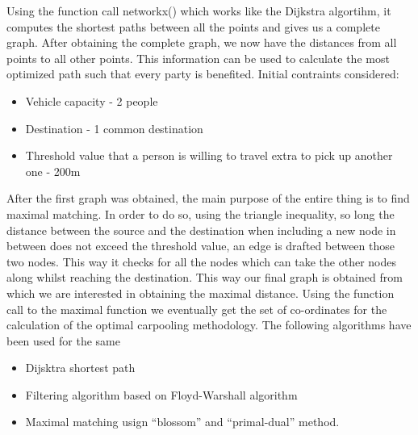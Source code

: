 \documentclass[main.tex]{subfiles}
\begin{document}
Using the function call networkx() which works like the Dijkstra algortihm, it
computes the shortest paths between all the points and gives us a complete
graph.  After obtaining the complete graph, we now have the distances from all
points to all other points. This information can be used to calculate the most
optimized path such that every party is benefited.
Initial contraints considered:
\begin{itemize}
  \item Vehicle capacity - 2 people
  \item Destination      - 1 common destination
  \item Threshold value that a person is willing to travel extra to pick up
    another one - 200m
\end{itemize}

After the first graph was obtained, the main purpose of the entire thing is to
find maximal matching. In order to do so, using the triangle inequality, so long
the distance between the source and the destination when including a new node in
between does not exceed the threshold value, an edge is drafted between those
two nodes. This way it checks for all the nodes which can take the other nodes
along whilst reaching the destination.
This way our final graph is obtained from which we are interested in obtaining
the maximal distance. Using the function call to the maximal function we
eventually get the set of co-ordinates for the calculation of the optimal
carpooling methodology.
The following algorithms have been used for the same
\begin{itemize}
  \item Dijsktra shortest path
  \item Filtering algorithm based on Floyd-Warshall algorithm
  \item Maximal matching usign ``blossom'' and ``primal-dual'' method.
\end{itemize}
\end{document}
